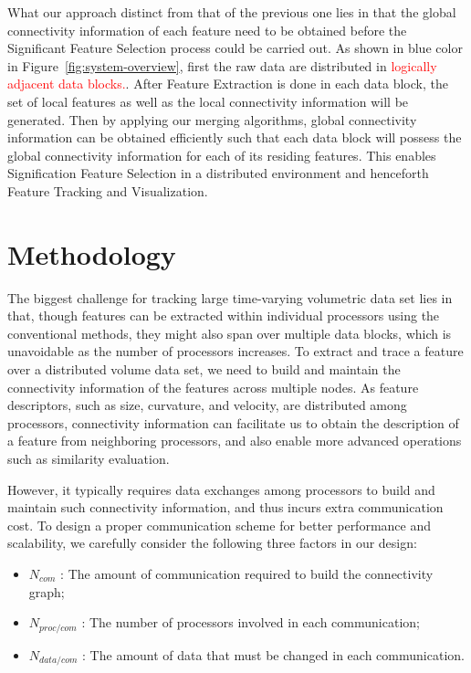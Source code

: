 \documentclass[10pt, conference, compsocconf]{IEEEtran}
\begin{document}
What our approach distinct from that of the previous one lies in that the global connectivity information of each feature need to be obtained before the Significant Feature Selection process could be carried out. As shown in blue color in Figure~\ref{fig:system-overview}, first the raw data are distributed in \textcolor{red}{logically adjacent data blocks.}. After Feature Extraction is done in each data block, the set of local features as well as the local connectivity information will be generated. Then by applying our merging algorithms, global connectivity information can be obtained efficiently such that each data block will possess the global connectivity information for each of its residing features. This enables Signification Feature Selection in a distributed environment and henceforth Feature Tracking and Visualization.

\section{Methodology}
The biggest challenge for tracking large time-varying volumetric data set lies in that, though features can be extracted within individual processors using the conventional methods, they might also span over multiple data blocks, which is unavoidable as the number of processors increases. To extract and trace a feature over a distributed volume data set, we need to build and maintain the connectivity information of the features across multiple nodes. As feature descriptors, such as size, curvature, and velocity, are distributed among processors, connectivity information can facilitate us to obtain the description of a feature from neighboring processors, and also enable more advanced operations such as similarity evaluation.

However, it typically requires data exchanges among processors to build and maintain such connectivity information, and thus incurs extra communication cost. To design a proper communication scheme for better performance and scalability, we carefully consider the following three factors in our design:

\begin{itemize}
	\item $N_{com}$ : The amount of communication required to build the connectivity graph;
	\item $N_{proc/com}$ : The number of processors involved in each communication;
	\item $N_{data/com}$ : The amount of data that must be changed in each communication.
\end{itemize}
\end{document}
